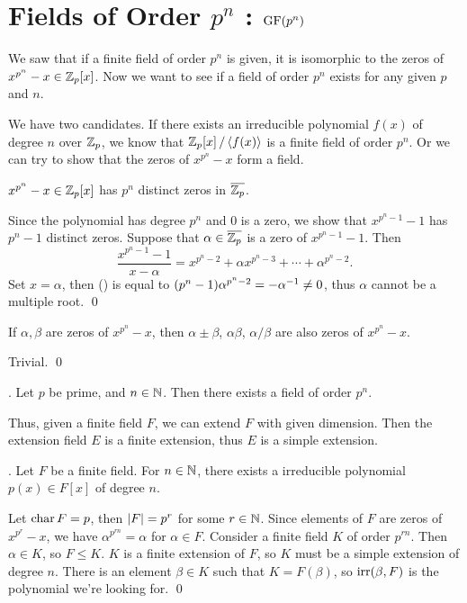 \section*{Fields of Order \(p^n\) : \(\mathrm{GF}(p^n)\)}

We saw that if a finite field of order \(p^n\) is given, it is isomorphic to the zeros of \(x^{p^n} - x \in \mathbb{Z}_p[x]\). Now we want to see if a field of order \(p^n\) exists for any given \(p\) and \(n\).

We have two candidates. If there exists an irreducible polynomial \(f(x)\) of degree \(n\) over \(\mathbb{Z}_p\), we know that \(\mathbb{Z}_p[x] \operatorname{/} \left\langle f(x) \right\rangle\) is a finite field of order \(p^n\). Or we can try to show that the zeros of \(x^{p^n} - x\) form a field.

 \(x^{p^n} -x \in \mathbb{Z}_p[x]\) has \(p^n\) distinct zeros in \(\bar{\Z_p}\).

\pf Since the polynomial has degree \(p^n\) and \(0\) is a zero, we show that \(x^{p^n - 1} - 1\) has \(p^n - 1\) distinct zeros. Suppose that \(\alpha \in \bar{\Z_p}\) is a zero of \(x^{p^n - 1} - 1\). Then
\[\tag{\mast}
    \frac{x^{p^n - 1} - 1}{x - \alpha} = x^{p^n - 2} + \alpha x^{p^n-3} + \cdots + \alpha^{p^n - 2}.
\]
Set \(x = \alpha\), then (\mast) is equal to \((p^n - 1)\alpha^{p^n - 2} = -\alpha^{-1} \neq 0\), thus \(\alpha\) cannot be a multiple root. \qed

 If \(\alpha, \beta\) are zeros of \(x^{p^n} - x\), then \(\alpha \pm \beta\), \(\alpha\beta\), \(\alpha/\beta\) are also zeros of \(x^{p^n} - x\).

\pf Trivial. \qed

\thm. Let \(p\) be prime, and \(n \in \mathbb{N}\). Then there exists a field of order \(p^n\).

Thus, given a finite field \(F\), we can extend \(F\) with given dimension. Then the extension field \(E\) is a finite extension, thus \(E\) is a simple extension.

\cor. Let \(F\) be a finite field. For \(n \in \mathbb{N}\), there exists a irreducible polynomial \(p(x) \in F[x]\) of degree \(n\).

\pf Let \(\operatorname{char} F = p\), then \(\left| F \right| = p^r\) for some \(r \in \mathbb{N}\). Since elements of \(F\) are zeros of \(x^{p^r} - x\), we have \(\alpha^{p^{rn}} = \alpha\) for \(\alpha \in F\). Consider a finite field \(K\) of order \(p^{rn}\). Then \(\alpha \in K\), so \(F \leq K\). \(K\) is a finite extension of \(F\), so \(K\) must be a simple extension of degree \(n\). There is an element \(\beta \in K\) such that \(K = F(\beta)\), so \(\mathrm{irr}(\beta, F)\) is the polynomial we're looking for. \qed

